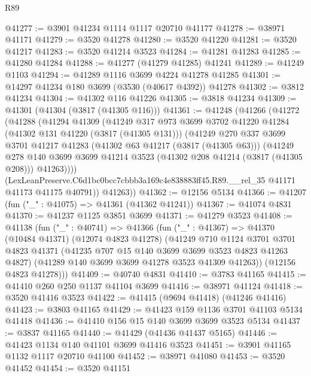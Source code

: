 \begin{lexlean}{R89}
\begin{coremodule}
@41277 := @3901 @41234 @1114 @1117 @20710 @41177
@41278 := @38971 @41171
@41279 := @3520 @41278
@41280 := @3520 @41220
@41281 := @3520 @41217
@41283 := @3520 @41214 @3523
@41284 := @41281 @41283
@41285 := @41280 @41284
@41288 := @41277 (@41279 @41285) @41241
@41289 := @41249 @1103
@41294 := @41289 @1116 @3699 @4224 @41278 @41285
@41301 := @14297 @41234 @180 @3699 (@3530 (@40617 @4392)) @41278
@41302 := @3812 @41234
@41304 := @41302 @116 @41226
@41305 := @3818 @41234
@41309 := @41301 (@41304 (@3817 (@41305 @116)))
@41361 := @41248
    (@41266
      (@41272
        (@41288
          (@41294
            @41309
            (@41249
              @317
              @973
              @3699
              @3702
              @41220
              @41284
              (@41302 @131 @41220 (@3817 (@41305 @131)))
              (@41249
                @270
                @337
                @3699
                @3701
                @41217
                @41283
                (@41302 @63 @41217 (@3817 (@41305 @63)))
                (@41249
                  @278
                  @140
                  @3699
                  @3699
                  @41214
                  @3523
                  (@41302 @208 @41214 (@3817 (@41305 @208)))
                  @41263))))
          (LexLeanPreserve.C6d1bc0bcc7cbbb3a169c4e838883ff45.R89.__rel_35
            @41171
            @41173
            @41175
            @40791))
        @41263))
@41362 := @12156 @5134
@41366 := @41207 (fun ("_" : @41075) => @41361 (@41362 @41241))
@41367 := @41074 @4831
@41370 := @41237 @1125 @3851 @3699
@41371 := @41279 @3523
@41408 := @41138
    (fun ("_" : @40741) =>
    @41366
      (fun ("_" : @41367) =>
      @41370
        (@10484 @41371)
        (@12074 @4823 @41278)
        (@41249
          @710
          @1124
          @3701
          @3701
          @4823
          @41371
          (@41235 @707 @15 @140 @3699 @3699 @3523 @4823 @41263 @4827)
          (@41289 @140 @3699 @3699 @41278 @3523 @41309 @41263))
        (@12156 @4823 @41278)))
@41409 := @40740 @4831
@41410 := @3783 @41165
@41415 := @41410 @260 @250 @1137 @41104 @3699
@41416 := @38971 @41124
@41418 := @3520 @41416 @3523
@41422 := @41415 (@9694 @41418) (@41246 @41416)
@41423 := @3803 @41165
@41429 := @41423 @159 @1136 @3701 @41103 @5134 @41418
@41436 := @41410 @156 @15 @140 @3699 @3699 @3523 @5134
@41437 := @3837 @41165
@41440 := @41429 (@41436 @41437 @5165)
@41446 := @41423 @1134 @140 @41101 @3699 @41416 @3523
@41451 := @3901 @41165 @1132 @1117 @20710 @41100
@41452 := @38971 @41080
@41453 := @3520 @41452
@41454 := @3520 @41151

\end{coremodule}
\end{lexlean}
